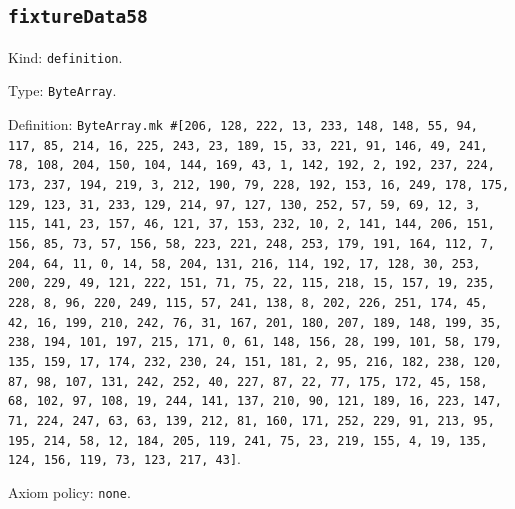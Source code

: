 \documentclass[11pt]{article}
\begin{document}
\subsection*{\texttt{fixtureData58}}
\noindent Kind: \texttt{definition}.\par
\noindent Type: \texttt{ByteArray}.\par
\noindent Definition: \texttt{ByteArray.mk \#[206, 128, 222, 13, 233, 148, 148, 55, 94, 117, 85, 214, 16, 225, 243, 23, 189, 15, 33, 221, 91, 146, 49, 241, 78, 108, 204, 150, 104, 144, 169, 43, 1, 142, 192, 2, 192, 237, 224, 173, 237, 194, 219, 3, 212, 190, 79, 228, 192, 153, 16, 249, 178, 175, 129, 123, 31, 233, 129, 214, 97, 127, 130, 252, 57, 59, 69, 12, 3, 115, 141, 23, 157, 46, 121, 37, 153, 232, 10, 2, 141, 144, 206, 151, 156, 85, 73, 57, 156, 58, 223, 221, 248, 253, 179, 191, 164, 112, 7, 204, 64, 11, 0, 14, 58, 204, 131, 216, 114, 192, 17, 128, 30, 253, 200, 229, 49, 121, 222, 151, 71, 75, 22, 115, 218, 15, 157, 19, 235, 228, 8, 96, 220, 249, 115, 57, 241, 138, 8, 202, 226, 251, 174, 45, 42, 16, 199, 210, 242, 76, 31, 167, 201, 180, 207, 189, 148, 199, 35, 238, 194, 101, 197, 215, 171, 0, 61, 148, 156, 28, 199, 101, 58, 179, 135, 159, 17, 174, 232, 230, 24, 151, 181, 2, 95, 216, 182, 238, 120, 87, 98, 107, 131, 242, 252, 40, 227, 87, 22, 77, 175, 172, 45, 158, 68, 102, 97, 108, 19, 244, 141, 137, 210, 90, 121, 189, 16, 223, 147, 71, 224, 247, 63, 63, 139, 212, 81, 160, 171, 252, 229, 91, 213, 95, 195, 214, 58, 12, 184, 205, 119, 241, 75, 23, 219, 155, 4, 19, 135, 124, 156, 119, 73, 123, 217, 43]}.\par
\noindent Axiom policy: \texttt{none}.\par
\end{document}
